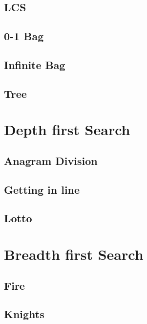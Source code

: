     \subsection{LCS}
        
    \subsection{0-1 Bag}
        
    \subsection{Infinite Bag}
        
    \subsection{Tree}
        

\section{Depth first Search}
    \subsection{Anagram Division}
            
    \subsection{Getting in line}
            
    \subsection{Lotto}
            

\section{Breadth first Search}
    \subsection{Fire}
            
    \subsection{Knights}
            
